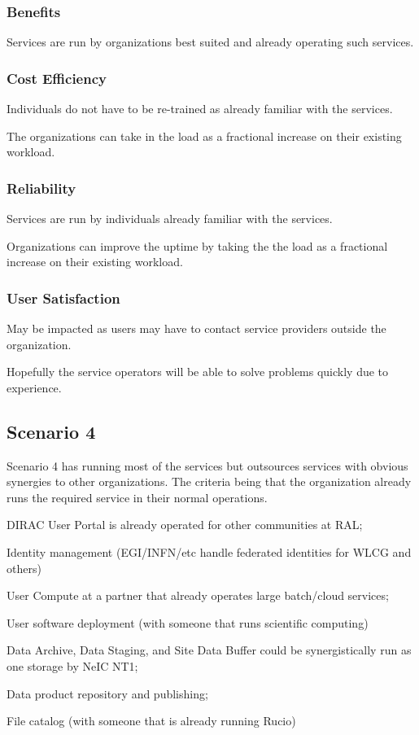 \documentclass[12pt,a4paper]{article}
\begin{document}
\subsubsection*{Benefits}
\bitm
\item Services are run by organizations best suited and already operating such services.
\eitm

\subsubsection*{Cost Efficiency}
\bitm
\item Individuals do not have to be re-trained as already familiar with the services.
\item The organizations can take in the \ED load as a fractional increase on their existing workload.
\eitm

\subsubsection*{Reliability}
\bitm
\item Services are run by individuals already familiar with the services.
\item Organizations can improve the uptime by taking the the \ED load as a fractional increase on their existing workload.
\eitm

\subsubsection*{User Satisfaction}
\bitm
\item May be impacted as users may have to contact service providers outside the \EC organization.
  \item Hopefully the service operators will be able to solve problems quickly due to experience.
\eitm

\subsection{Scenario 4}
\label{ssec:scen4}

Scenario 4 has \EC running most of the services but outsources services with
obvious synergies to other organizations.
The criteria being that the organization already runs the required service in their normal
operations.
\bitm
\item DIRAC User Portal is already operated for other communities at RAL;
\item Identity management (EGI/INFN/etc handle federated identities for WLCG and others)
\item User Compute at a partner that already operates large batch/cloud services;
\item User software deployment (with someone that runs scientific computing)
\item Data Archive, Data Staging, and Site Data Buffer could be synergistically run as one storage by NeIC NT1;
\item Data product repository and publishing;
\item File catalog (with someone that is already running Rucio)
  \eitm
  
\end{document}
